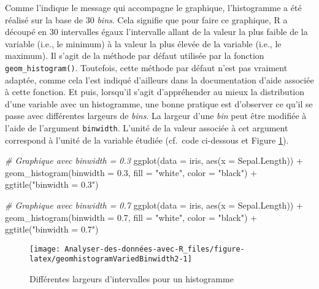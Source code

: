 \documentclass[
]{book}
\newenvironment{Shaded}{\begin{snugshade}}{\end{snugshade}}
\newcommand{\AttributeTok}[1]{\textcolor[rgb]{0.77,0.63,0.00}{#1}}
\newcommand{\CommentTok}[1]{\textcolor[rgb]{0.56,0.35,0.01}{\textit{#1}}}
\newcommand{\FloatTok}[1]{\textcolor[rgb]{0.00,0.00,0.81}{#1}}
\newcommand{\FunctionTok}[1]{\textcolor[rgb]{0.00,0.00,0.00}{#1}}
\newcommand{\NormalTok}[1]{#1}
\newcommand{\SpecialCharTok}[1]{\textcolor[rgb]{0.00,0.00,0.00}{#1}}
\newcommand{\StringTok}[1]{\textcolor[rgb]{0.31,0.60,0.02}{#1}}
\begin{document}
Comme l'indique le message qui accompagne le graphique, l'histogramme a été réalisé sur la base de 30 \emph{bins}. Cela signifie que pour faire ce graphique, R a découpé en 30 intervalles égaux l'intervalle allant de la valeur la plus faible de la variable (i.e., le minimum) à la valeur la plus élevée de la variable (i.e., le maximum). Il s'agit de la méthode par défaut utilisée par la fonction \texttt{geom\_histogram()}. Toutefois, cette méthode par défaut n'est pas vraiment adaptée, comme cela l'est indiqué d'ailleurs dans la documentation d'aide associée à cette fonction. Et puis, lorsqu'il s'agit d'appréhender au mieux la distribution d'une variable avec un histogramme, une bonne pratique est d'observer ce qu'il se passe avec différentes largeurs de \emph{bins}. La largeur d'une \emph{bin} peut être modifiée à l'aide de l'argument \texttt{binwidth}. L'unité de la valeur associée à cet argument correspond à l'unité de la variable étudiée (cf.~code ci-dessous et Figure \ref{fig:geomhistogramVariedBinwidth2}).

\begin{Shaded}
\begin{Highlighting}[]
\CommentTok{\# Graphique avec binwidth = 0.3}
\FunctionTok{ggplot}\NormalTok{(}\AttributeTok{data =}\NormalTok{ iris, }\FunctionTok{aes}\NormalTok{(}\AttributeTok{x =}\NormalTok{ Sepal.Length)) }\SpecialCharTok{+}
  \FunctionTok{geom\_histogram}\NormalTok{(}\AttributeTok{binwidth  =} \FloatTok{0.3}\NormalTok{,}
                 \AttributeTok{fill =} \StringTok{"white"}\NormalTok{,}
                 \AttributeTok{color =} \StringTok{"black"}\NormalTok{) }\SpecialCharTok{+}
  \FunctionTok{ggtitle}\NormalTok{(}\StringTok{"binwidth = 0.3"}\NormalTok{)}

\CommentTok{\# Graphique avec binwidth = 0.7}
\FunctionTok{ggplot}\NormalTok{(}\AttributeTok{data =}\NormalTok{ iris, }\FunctionTok{aes}\NormalTok{(}\AttributeTok{x =}\NormalTok{ Sepal.Length)) }\SpecialCharTok{+}
  \FunctionTok{geom\_histogram}\NormalTok{(}\AttributeTok{binwidth  =} \FloatTok{0.7}\NormalTok{,}
                 \AttributeTok{fill =} \StringTok{"white"}\NormalTok{,}
                 \AttributeTok{color =} \StringTok{"black"}\NormalTok{) }\SpecialCharTok{+}
  \FunctionTok{ggtitle}\NormalTok{(}\StringTok{"binwidth = 0.7"}\NormalTok{)}
\end{Highlighting}
\end{Shaded}

\begin{figure}

{\centering \texttt{[image: Analyser-des-données-avec-R\_files/figure-latex/geomhistogramVariedBinwidth2-1]} 

}

\caption{Différentes largeurs d'intervalles pour un histogramme}\label{fig:geomhistogramVariedBinwidth2}
\end{figure}
\end{document}
